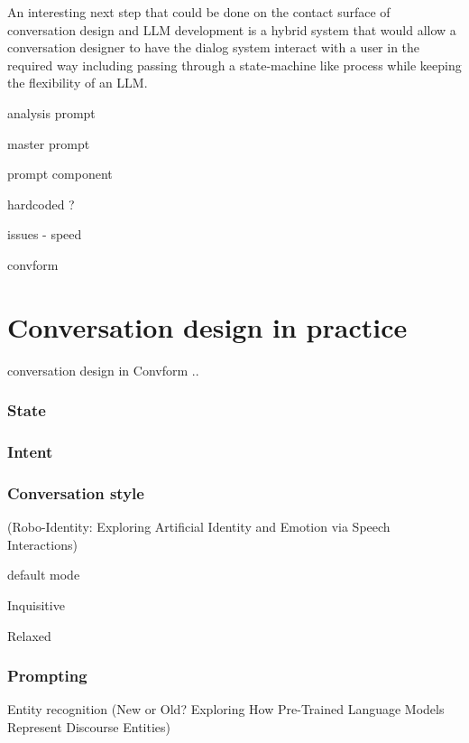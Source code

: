 \documentclass[12pt]{report}
\begin{document}
{An interesting next step that could be done
on the contact surface of conversation design and LLM development
is a hybrid system that would allow a conversation designer
to have the dialog system interact with a user
in the required way including
passing through a state-machine like process
while keeping the flexibility of an LLM.

analysis prompt

master prompt

prompt component

hardcoded ?

issues - speed

convform





\section{Conversation design in practice}

\par
conversation design in Convform ..

\subsubsection{State}

\subsubsection{Intent}

\subsubsection{Conversation style}

(Robo-Identity: Exploring Artificial Identity and Emotion via Speech Interactions)

\par
default mode

\par
Inquisitive

\par
Relaxed

\subsubsection{Prompting}

\par
Entity recognition
(New or Old? Exploring How Pre-Trained Language Models Represent Discourse Entities)

}
\end{document}
